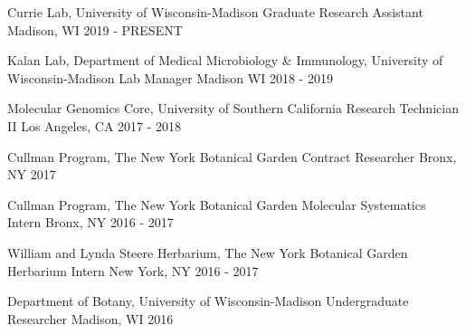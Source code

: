 
\begin{cventries}
  \cventry
    {Currie Lab, University of Wisconsin-Madison} %
    {Graduate Research Assistant} %
    {Madison, WI} %
    {2019 - PRESENT} %
    
  \cventry
    {Kalan Lab, Department of Medical Microbiology & Immunology, University of Wisconsin-Madison} %
    {Lab Manager} %
    {Madison WI} %
    {2018 - 2019} %
  

  \cventry
    {Molecular Genomics Core, University of Southern California} %
    {Research Technician II} %
    {Los Angeles, CA} %
    {2017 - 2018} %
   

  \cventry
    {Cullman Program, The New York Botanical Garden} %
    {Contract Researcher} %
    {Bronx, NY} %
    {2017} %
   

  \cventry
    {Cullman Program, The New York Botanical Garden} %
    {Molecular Systematics Intern} %
    {Bronx, NY} %
    {2016 - 2017} %
   

  \cventry
    {William and Lynda Steere Herbarium, The New York Botanical Garden} %
    {Herbarium Intern} %
    {New York, NY} %
    {2016 - 2017} %
  
  \cventry
    {Department of Botany, University of Wisconsin-Madison} %
    {Undergraduate Researcher} %
    {Madison, WI} %
    {2016} %
  
\end{cventries}
